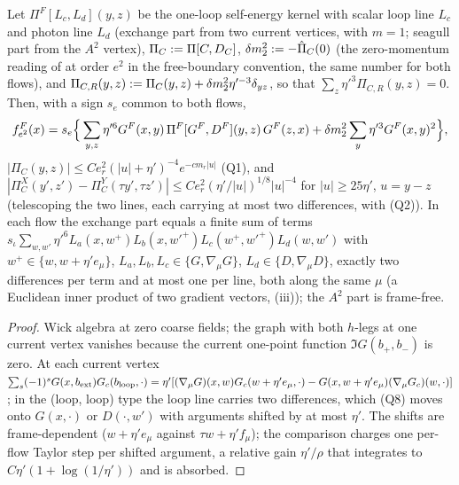 \begin{lemma}\label{rot:lem:CK4}
Let $\Pi^F[L_c,L_d](y,z)$ be the one-loop self-energy kernel with scalar loop line $L_c$ and photon line $L_d$ (exchange part from two current vertices, \cite[(3.22)]{K1} with $m=1$; seagull part from the $A^2$ vertex), $\Pi_C:=\Pi[C,D_C]$, $\delta m^2_2:=-\hat\Pi_C(0)$ (the zero-momentum reading of \cite[(3.33)]{K1} at order $e^2$ in the free-boundary convention, the same number for both flows), and $\Pi_{C,R}(y,z):=\Pi_C(y,z)+\delta m^2_2\eta'^{-3}\delta_{yz}$, so that $\sum_z\eta'^3\Pi_{C,R}(y,z)=0$. Then, with a sign $s_e$ common to both flows,
\[
f^F_{e^2}(x)=s_e\Big\{\sum_{y,z}\eta'^6G^F(x,y)\,\Pi^F[G^F,D^F](y,z)\,G^F(z,x)+\delta m^2_2\sum_y\eta'^3G^F(x,y)^2\Big\},
\]
$|\Pi_C(y,z)|\le Ce_r^2(|u|+\eta')^{-4}e^{-cm_r|u|}$ (Q1), and $|\Pi^X_C(y',z')-\Pi^Y_C(\tau y',\tau z')|\le Ce_r^2(\eta'/|u|)^{1/8}|u|^{-4}$ for $|u|\ge25\eta'$, $u=y-z$ (telescoping the two lines, each carrying at most two differences, with (Q2)). In each flow the exchange part equals a finite sum of terms $s_\iota\sum_{w,w'}\eta'^6L_a(x,w^+)L_b(x,w'^+)L_c(w^+,w'^+)L_d(w,w')$ with $w^+\in\{w,w+\eta'e_\mu\}$, $L_a,L_b,L_c\in\{G,\nabla_\mu G\}$, $L_d\in\{D,\nabla_\mu D\}$, exactly two differences per term and at most one per line, both along the same $\mu$ (a Euclidean inner product of two gradient vectors, (iii)); the $A^2$ part is frame-free.
\end{lemma}
\begin{proof}
Wick algebra at zero coarse fields; the graph with both $h$-legs at one current vertex vanishes because the current one-point function $\Im G(b_+,b_-)$ is zero. At each current vertex $\sum_s(-1)^sG(x,b_{\rm ext})G_c(b_{\rm loop},\cdot)=\eta'[(\nabla_\mu G)(x,w)G_c(w+\eta'e_\mu,\cdot)-G(x,w+\eta'e_\mu)(\nabla_\mu G_c)(w,\cdot)]$; in the (loop, loop) type the loop line carries two differences, which (Q8) moves onto $G(x,\cdot)$ or $D(\cdot,w')$ with arguments shifted by at most $\eta'$. The shifts are frame-dependent ($w+\eta'e_\mu$ against $\tau w+\eta'f_\mu$); the comparison charges one per-flow Taylor step per shifted argument, a relative gain $\eta'/\rho$ that integrates to $C\eta'(1+\log(1/\eta'))$ and is absorbed.
\end{proof}

